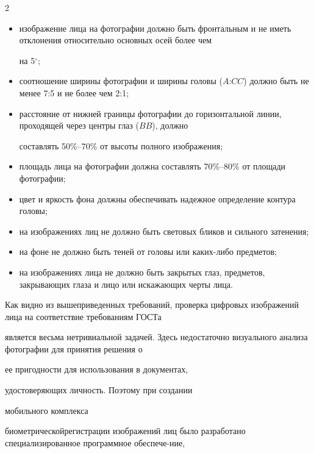\begin{multicols}{2}
\begin{itemize}
\item изображение лица на фотографии должно быть фронтальным и не иметь отклонения относительно основных осей более чем 


на 5$^\circ$;


\item соотношение ширины фотографии и ширины головы ($A$:$CC$) должно быть не менее 7:5 и не более чем 2:1;


\item расстояние от нижней границы фотографии до горизонтальной линии, проходящей через центры глаз ($BB$), должно 


составлять 50\%--70\% от высоты полного изображения;


\item площадь лица на фотографии должна со\-став\-лять 70\%--80\% от площади фотографии;


\item цвет и яркость фона должны обеспечивать надежное определение контура головы;


\item на изображениях лиц не должно быть световых бликов и сильного затенения;


\item на фоне не должно быть теней от головы или каких-либо предметов;


\item на изображениях лица не должно быть закрытых глаз, предметов, закрывающих глаза и лицо или искажающих черты лица.


\end{itemize}





Как видно из вышеприведенных требований, проверка цифровых изображений лица на соответствие требованиям ГОСТа 


является весьма нетривиальной задачей. Здесь недостаточно визуального анализа фотографии для принятия решения о\linebreak 


ее  пригодности для использования в документах,


 удос\-то\-ве\-ря\-ющих личность. Поэтому при создании


 мобильного комплекса 


биометрической\linebreak регистрации изображений лиц было разработано специ\-ализированное программное обеспече-\linebreak ние, 



\end{multicols}
